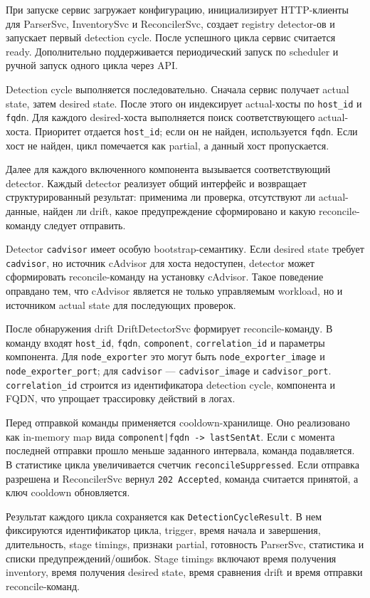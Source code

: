 При запуске сервис загружает конфигурацию, инициализирует HTTP-клиенты для ParserSvc, InventorySvc и ReconcilerSvc, создает registry detector-ов и запускает первый detection cycle. После успешного цикла сервис считается ready. Дополнительно поддерживается периодический запуск по scheduler и ручной запуск одного цикла через API.

Detection cycle выполняется последовательно. Сначала сервис получает actual state, затем desired state. После этого он индексирует actual-хосты по \texttt{host\_id} и \texttt{fqdn}. Для каждого desired-хоста выполняется поиск соответствующего actual-хоста. Приоритет отдается \texttt{host\_id}; если он не найден, используется \texttt{fqdn}. Если хост не найден, цикл помечается как partial, а данный хост пропускается.

Далее для каждого включенного компонента вызывается соответствующий detector. Каждый detector реализует общий интерфейс и возвращает структурированный результат: применима ли проверка, отсутствуют ли actual-данные, найден ли drift, какое предупреждение сформировано и какую reconcile-команду следует отправить.

Detector \texttt{cadvisor} имеет особую bootstrap-семантику. Если desired state требует \texttt{cadvisor}, но источник cAdvisor для хоста недоступен, detector может сформировать reconcile-команду на установку cAdvisor. Такое поведение оправдано тем, что cAdvisor является не только управляемым workload, но и источником actual state для последующих проверок.

После обнаружения drift DriftDetectorSvc формирует reconcile-команду. В команду входят \texttt{host\_id}, \texttt{fqdn}, \texttt{component}, \texttt{correlation\_id} и параметры компонента. Для \texttt{node\_exporter} это могут быть \texttt{node\_exporter\_image} и \texttt{node\_exporter\_port}; для \texttt{cadvisor} --- \texttt{cadvisor\_image} и \texttt{cadvisor\_port}. \texttt{correlation\_id} строится из идентификатора detection cycle, компонента и FQDN, что упрощает трассировку действий в логах.

Перед отправкой команды применяется cooldown-хранилище. Оно реализовано как in-memory map вида \texttt{component|fqdn -> lastSentAt}. Если с момента последней отправки прошло меньше заданного интервала, команда подавляется. В статистике цикла увеличивается счетчик \texttt{reconcileSuppressed}. Если отправка разрешена и ReconcilerSvc вернул \texttt{202 Accepted}, команда считается принятой, а ключ cooldown обновляется.

Результат каждого цикла сохраняется как \texttt{DetectionCycleResult}. В нем фиксируются идентификатор цикла, trigger, время начала и завершения, длительность, stage timings, признаки partial, готовность ParserSvc, статистика и списки предупреждений/ошибок. Stage timings включают время получения inventory, время получения desired state, время сравнения drift и время отправки reconcile-команд.

